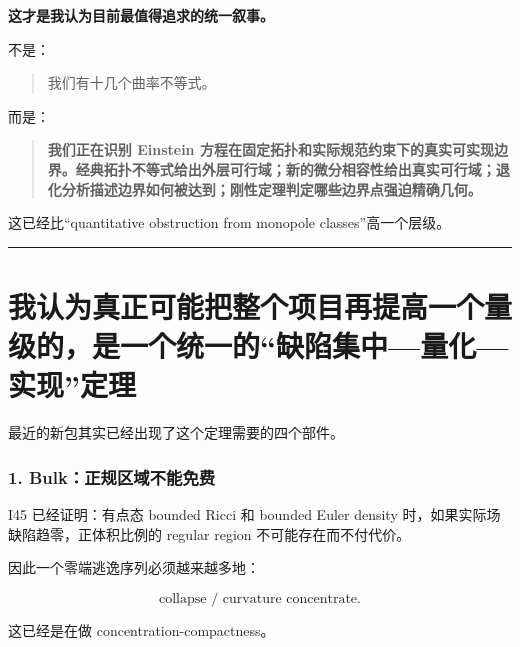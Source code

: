 \documentclass[
  10pt,
]{article}
\begin{document}
\textbf{这才是我认为目前最值得追求的统一叙事。}

不是：

\begin{quote}
我们有十几个曲率不等式。
\end{quote}

而是：

\begin{quote}
\textbf{我们正在识别 Einstein
方程在固定拓扑和实际规范约束下的真实可实现边界。经典拓扑不等式给出外层可行域；新的微分相容性给出真实可行域；退化分析描述边界如何被达到；刚性定理判定哪些边界点强迫精确几何。}
\end{quote}

这已经比``quantitative obstruction from monopole classes''高一个层级。

\begin{center}\rule{0.5\linewidth}{0.5pt}\end{center}

\hypertarget{ux6211ux8ba4ux4e3aux771fux6b63ux53efux80fdux628aux6574ux4e2aux9879ux76eeux518dux63d0ux9ad8ux4e00ux4e2aux91cfux7ea7ux7684ux662fux4e00ux4e2aux7edfux4e00ux7684ux7f3aux9677ux96c6ux4e2dux91cfux5316ux5b9eux73b0ux5b9aux7406}{%
\section{我认为真正可能把整个项目再提高一个量级的，是一个统一的``缺陷集中---量化---实现''定理}\label{ux6211ux8ba4ux4e3aux771fux6b63ux53efux80fdux628aux6574ux4e2aux9879ux76eeux518dux63d0ux9ad8ux4e00ux4e2aux91cfux7ea7ux7684ux662fux4e00ux4e2aux7edfux4e00ux7684ux7f3aux9677ux96c6ux4e2dux91cfux5316ux5b9eux73b0ux5b9aux7406}}

最近的新包其实已经出现了这个定理需要的四个部件。

\hypertarget{bulkux6b63ux89c4ux533aux57dfux4e0dux80fdux514dux8d39}{%
\subsubsection{1.
Bulk：正规区域不能免费}\label{bulkux6b63ux89c4ux533aux57dfux4e0dux80fdux514dux8d39}}

I45 已经证明：有点态 bounded Ricci 和 bounded Euler density
时，如果实际场缺陷趋零，正体积比例的 regular region
不可能存在而不付代价。

因此一个零端逃逸序列必须越来越多地：

\[
\text{collapse / curvature concentrate}.
\]

这已经是在做 concentration-compactness。
\end{document}
